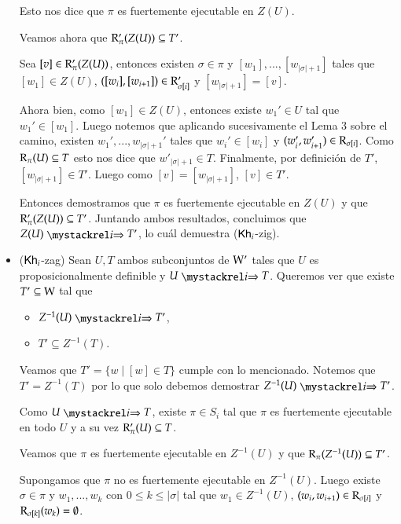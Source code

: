 \begin{demostracion}
\begin{itemize}
        Esto nos dice que $\pi$ es fuertemente ejecutable en $Z(U)$.

        Veamos ahora que $\mathrm{R}'_\pi(Z(U)) \subseteq T'$.

        Sea $[v] \in \mathrm{R}'_\pi(Z(U))$, entonces existen $\sigma \in \pi$ y $[w_1], ..., [w_{|\sigma|+1}]$ tales que $[w_1] \in Z(U)$, $([w_i],[w_{i+1}]) \in \mathrm{R}'_{\sigma[i]}$ y $[w_{|\sigma|+1}] = [v]$.

        Ahora bien, como $[w_1] \in Z(U)$, entonces existe $w_1' \in U$ tal que $w_1'\in [w_1]$. Luego notemos que aplicando sucesivamente el Lema 3 sobre el camino, existen $w_1',...,w_{|\sigma|+1}'$ tales que $w_i' \in [w_i]$ y $(w_i',w_{i+1}')\in \mathrm{R}_{\sigma[i]}$. Como $\mathrm{R}_\pi(U) \subseteq T$ esto nos dice que $w'_{|\sigma|+1} \in T$. Finalmente, por definición de $T'$, $[w_{|\sigma|+1}] \in T'$. Luego como $[v] = [w_{|\sigma|+1}]$, $[v] \in T'$.

        Entonces demostramos que $\pi$ es fuertemente ejecutable en $Z(U)$ y que $\mathrm{R}'_\pi(Z(U)) \subseteq T'$. Juntando ambos resultados, concluimos que $Z(U) \ultsExecAgi T'$, lo cuál demuestra ($\mathsf{Kh}_i$-zig).

       \item ($\mathsf{Kh}_i$-zag) Sean $U,T$ ambos subconjuntos de $\mathrm{W}'$ tales que $U$ es proposicionalmente definible y $U \ultsExecAgi T$. Queremos ver que existe $T' \subseteq \mathrm{W}$ tal que

       \begin{multicols}{2}
            \begin{itemize}
                \item $Z^{-1}(U) \ultsExecAgi T'$, 
                \item $T' \subseteq Z^{-1}(T)$.
            \end{itemize}
        \end{multicols}

        Veamos que $T' = \{w \mid [w] \in T\}$ cumple con lo mencionado. Notemos que $T' = Z^{-1}(T)$ por lo que solo debemos demostrar $Z^{-1}(U) \ultsExecAgi T'$.

        Como $U \ultsExecAgi T$, existe $\pi \in S_i$ tal que $\pi$ es fuertemente ejecutable en todo $U$ y a su vez $\mathrm{R}'_\pi(U) \subseteq T$.

        Veamos que $\pi$ es fuertemente ejecutable en $Z^{-1}(U)$ y que $\mathrm{R}_\pi(Z^{-1}(U)) \subseteq T'$.

        Supongamos que $\pi$ no es fuertemente ejecutable en $Z^{-1}(U)$. Luego existe $\sigma \in \pi$ y $w_1,...,w_k$ con $0 \le k \le |\sigma|$ tal que $w_1 \in Z^{-1}(U)$, $(w_i,w_{i+1}) \in \mathrm{R}_{\sigma[i]}$ y $\mathrm{R}_{\sigma[k]}(w_k) = \emptyset$. 


\end{itemize}
\end{demostracion}
